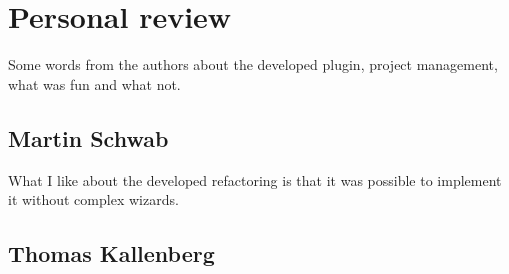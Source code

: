 \section{Personal review}

Some words from the authors about the developed plugin, project management, what 
was fun and what not.

\subsection{Martin Schwab}

What I like about the developed refactoring is that it was possible to implement 
it without complex wizards. 

\subsection{Thomas Kallenberg}

